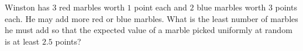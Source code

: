 Winston has $3$ red marbles worth $1$ point each and $2$ blue marbles worth $3$ points each. He may add more red or blue marbles. What is the least number of marbles he must add so that the expected value of a marble picked uniformly at random is at least $2.5$ points?
